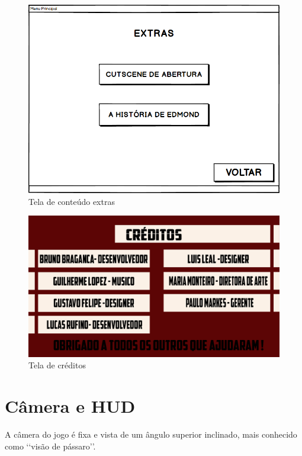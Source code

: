 \begin{figure}[!h]
    \label{Textra}
    \centering
    \caption{Tela de conteúdo extras}
    \includegraphics[keepaspectratio=true,scale=0.35]{images/EXTRAS.png}
\end{figure}

\begin{figure}[!h]
    \label{Tcred}
    \centering
    \caption{Tela de créditos}
   \includegraphics[keepaspectratio=true,scale=0.35]{images/telaCreditos.png}
\end{figure}

\vspace*{10cm}
\newpage
\section{Câmera e HUD}
A câmera do jogo é fixa e vista de um ângulo superior inclinado, mais conhecido como \lq\lq visão de pássaro\rq\rq. 

